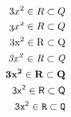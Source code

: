 \documentclass{article}
\begin{document}
\begin{align*}
    3x^2 \in R \subset Q              \\
    \mathnormal{3x^2 \in R \subset Q} \\
    \mathrm{3x^2 \in R \subset Q}     \\
    \mathit{3x^2 \in R \subset Q}     \\
    \mathbf{3x^2 \in R \subset Q}     \\
    \mathsf{3x^2 \in R \subset Q}     \\
    \mathtt{3x^2 \in R \subset Q}
\end{align*}
\end{document}
